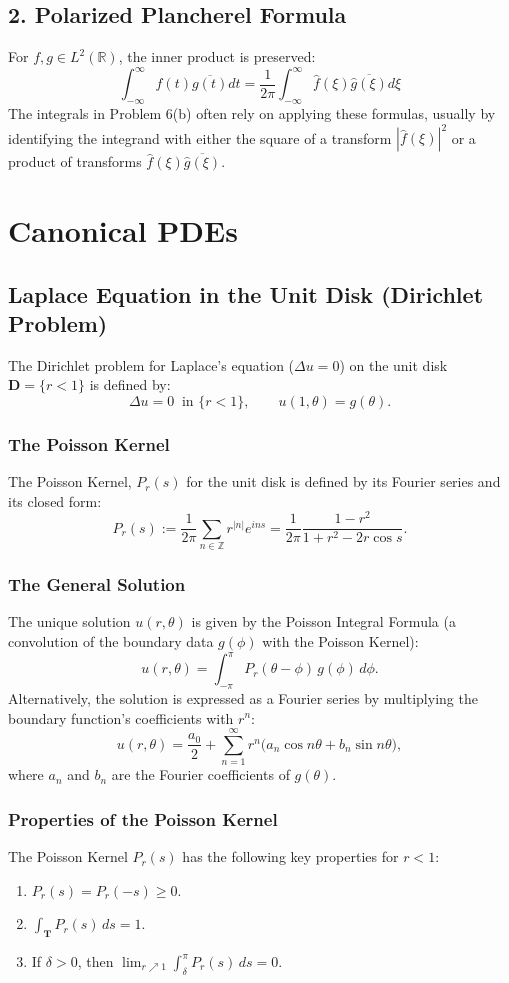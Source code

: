 \documentclass[12pt]{article}
\begin{document}
\subsection*{2. Polarized Plancherel Formula}
For $f, g \in L^2(\mathbb{R})$, the inner product is preserved:
\[
  \int_{-\infty}^{\infty} f(t)\overline{g(t)} dt = \frac{1}{2\pi} \int_{-\infty}^{\infty} \hat{f}(\xi)\overline{\hat{g}(\xi)} d\xi
\]
The integrals in Problem 6(b) often rely on applying these formulas, usually by identifying the integrand with either the square of a transform $|\hat{f}(\xi)|^2$ or a product of transforms $\hat{f}(\xi)\overline{\hat{g}(\xi)}$.

\section*{Canonical PDEs}

\subsection*{Laplace Equation in the Unit Disk (Dirichlet Problem)}
The Dirichlet problem for Laplace's equation ($\Delta u = 0$) on the unit disk $\mathbf{D} = \{r<1\}$ is defined by:
$$
\Delta u=0\ \text{ in } \{r<1\}, \qquad u(1,\theta)=g(\theta).
$$

\subsubsection*{The Poisson Kernel}
The Poisson Kernel, $P_r(s)$ for the unit disk is defined by its Fourier series and its closed form:
$$
P_r(s) := \frac{1}{2\pi} \sum_{n\in\mathbb{Z}} r^{|n|} e^{i n s} = \frac{1}{2\pi} \frac{1-r^2}{1+r^2-2r\cos s}.
$$

\subsubsection*{The General Solution}
The unique solution $u(r,\theta)$ is given by the Poisson Integral Formula (a convolution of the boundary data $g(\phi)$ with the Poisson Kernel):
$$
u(r,\theta)=\int_{-\pi}^{\pi} P_r(\theta-\phi)\,g(\phi)\,d\phi.
$$
Alternatively, the solution is expressed as a Fourier series by multiplying the boundary function's coefficients with $r^n$:
$$
u(r,\theta)=\frac{a_0}{2}+\sum_{n=1}^\infty r^n\big(a_n\cos n\theta+b_n\sin n\theta\big),
$$
where $a_n$ and $b_n$ are the Fourier coefficients of $g(\theta)$.

\subsubsection*{Properties of the Poisson Kernel}
The Poisson Kernel $P_r(s)$ has the following key properties for $r<1$:
\begin{enumerate}
    \item $P_r(s) = P_r(-s) \ge 0$.
    \item $\int_{\mathbf{T}} P_r(s)\,ds = 1$.
    \item If $\delta > 0$, then $\lim_{r\nearrow 1} \int_{\delta}^{\pi} P_r(s)\,ds = 0$.
\end{enumerate}
\end{document}
